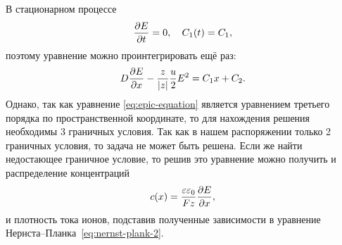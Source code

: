     В стационарном процессе
    \[
        \frac{\partial E}{\partial t} = 0,\quad C_1(t) = C_1,
    \]
    поэтому уравнение можно проинтегрировать ещё раз:
    \[
        D\frac{\partial E}{\partial x} - \frac{z}{\left| z \right|}\frac{u}{2}E^2 = C_1 x + C_2.
    \]
    Однако, так как уравнение \eqref{eq:epic-equation} является уравнением
    третьего порядка по пространственной координате, то для нахождения решения
    необходимы 3 граничных условия. Так как в нашем распоряжении только 2
    граничных условия, то задача не может быть решена. Если же найти
    недостающее граничное условие, то решив это уравнение можно получить и
    распределение концентраций
    \[
        c(x) = \frac{\varepsilon\varepsilon_0}{Fz}\frac{\partial E}{\partial x},
    \]
    и плотность тока ионов, подставив полученные зависимости в уравнение
    Нернста--Планка~\eqref{eq:nernst-plank-2}.
